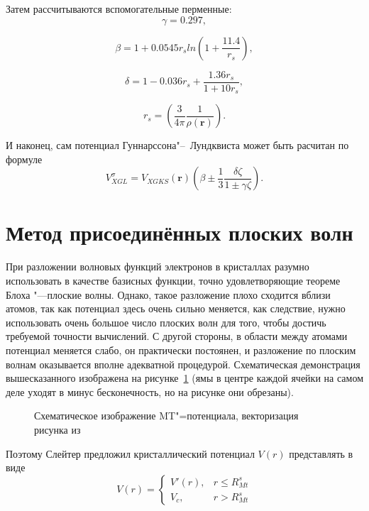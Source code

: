 Затем рассчитываются вспомогательные перменные:
\begin{equation}
  \gamma = 0.297,
\end{equation}

\begin{equation}
  \beta = 1 + 0.0545 r_s ln\left( 1 + \frac{11.4}{r_s} \right),
\end{equation}

\begin{equation}
  \delta = 1 - 0.036 r_s + \frac{1.36 r_s}{1 + 10 r_s},
\end{equation}

\begin{equation}
  r_s = \left( \frac{3}{4\pi} \frac{1}{\rho(\mathbf{r})} \right).
\end{equation}

И наконец, сам потенциал Гуннарссона"--~Лундквиста может быть расчитан по формуле
\begin{equation}
  V^{\sigma}_{XGL} = V_{XGKS}(\mathbf{r}) \left( \beta \pm \frac{1}{3} \frac{\delta \zeta}{1 \pm \gamma \zeta} \right).
\end{equation}

\section{\textbf{Метод присоединённых плоских волн}}
При разложении волновых функций электронов в кристаллах разумно использовать
в качестве базисных функции, точно удовлетворяющие теореме Блоха "---плоские
волны. Однако, такое разложение плохо сходится вблизи атомов, так как потенциал
здесь очень сильно меняется, как следствие, нужно использовать очень
большое число плоских волн для того, чтобы достичь требуемой точности
вычислений. С другой стороны, в области между атомами потенциал меняется слабо,
он практически постоянен, и разложение по плоским волнам оказывается вполне
адекватной процедурой. Схематическая демонстрация вышесказанного изображена
на рисунке~\ref{fig:muffintin} (ямы в центре каждой ячейки на самом деле уходят
в минус бесконечность, но на рисунке они обрезаны).
\begin{figure}[ht]
  \caption{Схематическое изображение MT"=потенциала, векторизация рисунка из \cite{Harrison}}
  \label{fig:muffintin}
\end{figure}

Поэтому\cite{afw-method}\cite{SlaterSimplification} Слейтер предложил кристаллический потенциал $V(r)$ представлять в виде
\begin{equation}
  V(r) =
  \begin{cases}
    V'(r), & r \le R_{Mt}^s \\
    V_c, & r > R_{Mt}^s
  \end{cases}
\end{equation}

